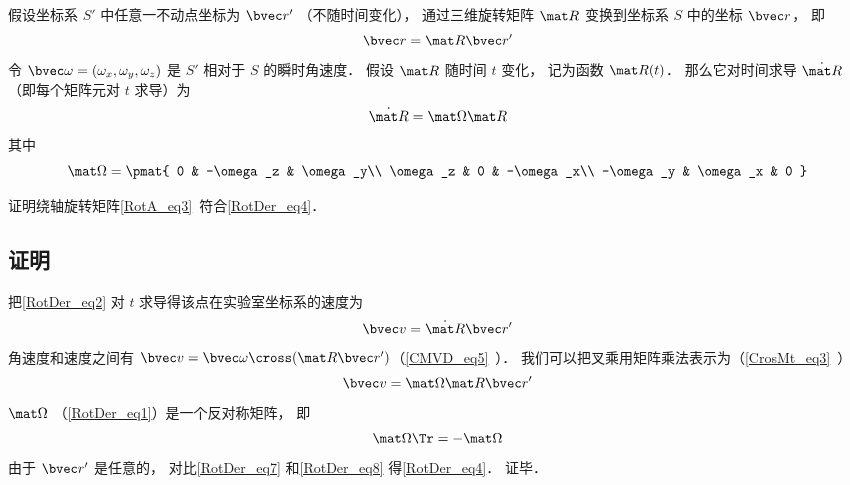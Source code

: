 

假设坐标系 $S'$ 中任意一不动点坐标为 $\bvec r'$ （不随时间变化）， 通过三维旋转矩阵 $\mat R$ 变换到坐标系 $S$ 中的坐标 $\bvec r$， 即
\begin{equation}\label{RotDer_eq2}
\bvec r = \mat R \bvec r'
\end{equation}
令 $\bvec\omega = (\omega_x, \omega_y, \omega_z)$ 是 $S'$ 相对于 $S$ 的瞬时角速度． 假设 $\mat R$ 随时间 $t$ 变化， 记为函数 $\mat R(t)$． 那么它对时间求导 $\dot{\mat R}$ （即每个矩阵元对 $t$ 求导）为
\begin{equation}\label{RotDer_eq4}
\dot{\mat R} = \mat \Omega \mat R
\end{equation}
其中
\begin{equation}\label{RotDer_eq1}
\mat \Omega = \pmat{
0 & -\omega_z & \omega_y\\
\omega_z & 0 & -\omega_x\\
-\omega_y & \omega_x & 0
}
\end{equation}

\begin{exercise}{}\label{RotDer_exe1}
证明绕轴旋转矩阵\autoref{RotA_eq3}~符合\autoref{RotDer_eq4}．
\end{exercise}

\subsection{证明}
把\autoref{RotDer_eq2} 对 $t$ 求导得该点在实验室坐标系的速度为
\begin{equation}\label{RotDer_eq7}
\bvec v = \dot{\mat R} \bvec r'
\end{equation}
角速度和速度之间有 $\bvec v = \bvec \omega \cross (\mat R \bvec r')$（\autoref{CMVD_eq5}~）． 我们可以把叉乘用矩阵乘法表示为（\autoref{CrosMt_eq3}~）
\begin{equation}\label{RotDer_eq8}
\bvec v = \mat\Omega \mat R \bvec r'
\end{equation}
$\mat\Omega$ （\autoref{RotDer_eq1}）是一个反对称矩阵， 即
\begin{equation}
\mat \Omega\Tr = -\mat \Omega
\end{equation}
由于 $\bvec r'$ 是任意的， 对比\autoref{RotDer_eq7} 和\autoref{RotDer_eq8} 得\autoref{RotDer_eq4}． 证毕．
